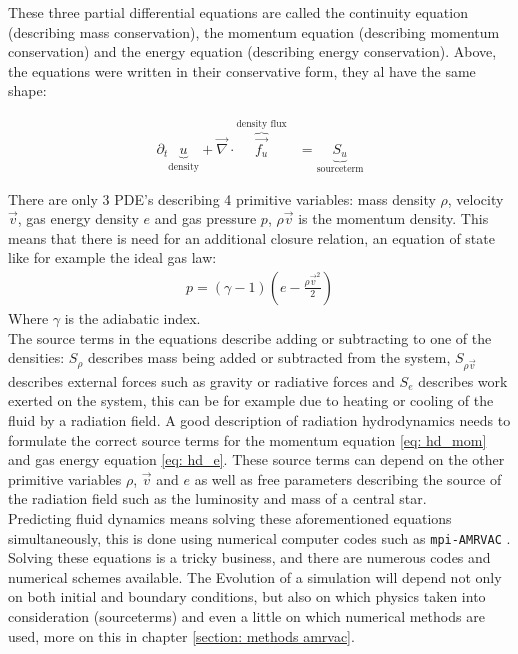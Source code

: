 These three partial differential equations are called the continuity equation (describing mass conservation), the momentum equation (describing momentum conservation) and the energy equation (describing energy conservation). Above, the equations were written in their conservative form, they al have the same shape:

\begin{align}
	\partial_t \underbrace{u}_\text{density} + \vec{\nabla} \cdot \overbrace{\vec{f_u}}^\text{density flux} &= \underbrace{S_u}_\text{sourceterm} \label{eq: conservative}
\end{align}

There are only 3 PDE's describing 4 primitive variables: mass density $\rho$, velocity $\vec{v}$, gas energy density $e$ and gas pressure $p$, $\rho \vec{v}$ is the momentum density. This means that there is need for an additional closure relation, an equation of state like for example the ideal gas law:
\begin{align}
	p = (\gamma - 1) \left(e - \frac{\rho \vec{v}^2}{2} \right) \label{gas_closing}
\end{align}
Where $\gamma$ is the adiabatic index.\\

The source terms in the equations describe adding or subtracting to one of the densities: $S_\rho$ describes mass being added or subtracted from the system, $S_{\rho \vec{v}}$ describes external forces such as gravity or radiative forces and $S_e$ describes work exerted on the system, this can be for example due to heating or cooling of the fluid by a radiation field. A good description of radiation hydrodynamics needs to formulate the correct source terms for the momentum equation \eqref{eq: hd_mom} and gas energy equation \eqref{eq: hd_e}. These source terms can depend on the other primitive variables $\rho$, $\vec{v}$ and $e$ as well as free parameters describing the source of the radiation field such as the luminosity and mass of a central star.\\

Predicting fluid dynamics means solving these aforementioned equations simultaneously, this is done using numerical computer codes such as \texttt{mpi-AMRVAC} \cite{Porth2014}. Solving these equations is a tricky business, and there are numerous codes and numerical schemes available. The Evolution of a simulation will depend not only on both initial and boundary conditions, but also on which physics taken into consideration (sourceterms) and even a little on which numerical methods are used, more on this in chapter \ref{section: methods amrvac}. \\

